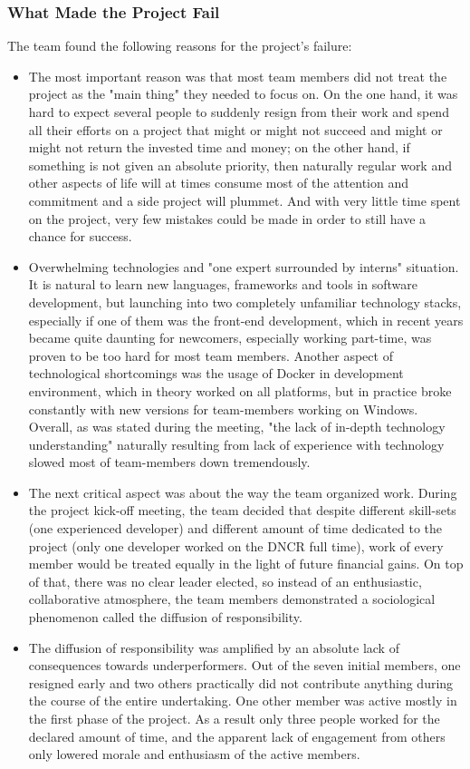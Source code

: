 \documentclass{article}
\begin{document}
\subsubsection{What Made the Project Fail}
The team found the following reasons for the project's failure:
\begin{itemize}
\item The most important reason was that most team members did not treat the project as the "main thing" they needed to focus on. On the one hand, it was hard to expect several people to suddenly resign from their work and spend all their efforts on a project that might or might not succeed and might or might not return the invested time and money; on the other hand, if something is not given an absolute priority, then naturally regular work and other aspects of life will at times consume most of the attention and commitment and a side project will plummet. And with very little time spent on the project, very few mistakes could be made in order to still have a chance for success.
\item Overwhelming technologies and "one expert surrounded by interns" situation. It is natural to learn new languages, frameworks and tools in software development, but launching into two completely unfamiliar technology stacks, especially if one of them was the front-end development, which in recent years became quite daunting for newcomers, especially working part-time, was proven to be too hard for most team members. Another aspect of technological shortcomings was the usage of Docker in development environment, which in theory worked on all platforms, but in practice broke constantly with new versions for team-members working on Windows. Overall, as was stated during the meeting, "the lack of in-depth technology understanding" naturally resulting from lack of experience with technology slowed most of team-members down tremendously.
\item The next critical aspect was about the way the team organized work. During the project kick-off meeting, the team decided that despite different skill-sets (one experienced developer) and different amount of time dedicated to the project (only one developer worked on the DNCR full time), work of every member would be treated equally in the light of future financial gains. On top of that, there was no clear leader elected, so instead of an enthusiastic, collaborative atmosphere, the team members demonstrated a sociological phenomenon called the diffusion of responsibility.
\item The diffusion of responsibility was amplified by an absolute lack of consequences towards underperformers. Out of the seven initial members, one resigned early and two others practically did not contribute anything during the course of the entire undertaking. One other member was active mostly in the first phase of the project. As a result only three people worked for the declared amount of time, and the apparent lack of engagement from others only lowered morale and enthusiasm of the active members. 

\end{itemize}
\end{document}
